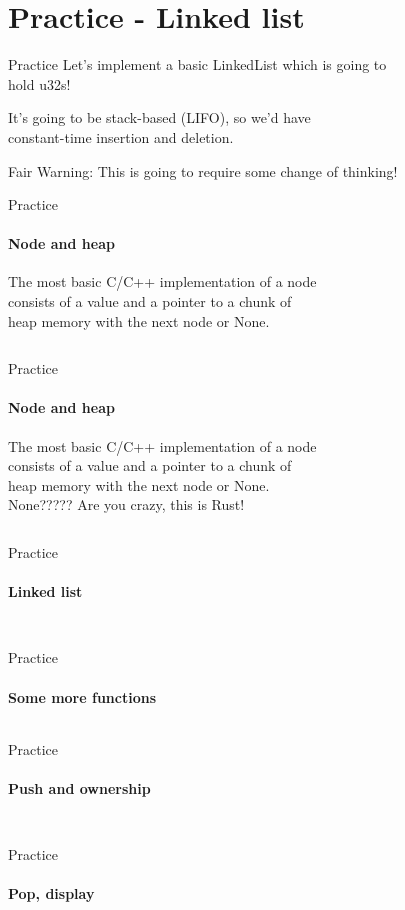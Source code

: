 \documentclass[usenames,dvipsnames,10pt,aspectratio=169]{beamer}
\begin{document}
\section{Practice - Linked list}

\begin{frame}{Practice}
\large
Let's implement a basic LinkedList which is going to\\
hold \textcolor{ucuyellow}{u32}s!
\vspace{0.2cm}

It's going to be stack-based (LIFO), so we'd have\\
constant-time insertion and deletion.
\vspace{0.2cm}

Fair Warning: This is going to require some change of thinking!
\end{frame}

\begin{frame}{Practice}
\framesubtitle{Node and heap}
\large
The most basic C/C++ implementation of a node\\
consists of a value and a pointer to a chunk of\\
heap memory with the next node or None.
\vspace{0.2cm}
\inputminted[fontsize=\large]{rust}{code/list1.rs}
\end{frame}

\begin{frame}{Practice}
\framesubtitle{Node and heap}
\large
The most basic C/C++ implementation of a node\\
consists of a value and a pointer to a chunk of\\
heap memory with the next node or None.\\
\vspace{0.2cm}
\textcolor{ucuyellow}{None????? Are you crazy, this is Rust!}
\vspace{0.2cm}
\inputminted[fontsize=\large]{rust}{code/list2.rs}
\end{frame}

\begin{frame}{Practice}
\framesubtitle{Linked list}
\inputminted[fontsize=\normalsize]{rust}{code/list3.rs}
\vspace{0.5cm}
\inputminted[fontsize=\normalsize]{rust}{code/list4.rs}
\end{frame}

\begin{frame}{Practice}
\framesubtitle{Some more functions}
\inputminted[fontsize=\normalsize]{rust}{code/list5.rs}
\end{frame}

\begin{frame}{Practice}
	\framesubtitle{Push and ownership}
\inputminted[fontsize=\normalsize]{rust}{code/list6.rs}
\vspace{0.5cm}
\inputminted[fontsize=\normalsize]{rust}{code/list7.rs}
\end{frame}

\begin{frame}{Practice}
	\framesubtitle{Pop, display}
\inputminted[fontsize=\footnotesize]{rust}{code/list8.rs}
\vspace{0.2cm}
\inputminted[fontsize=\footnotesize]{rust}{code/list9.rs}
\end{frame}
\end{document}
